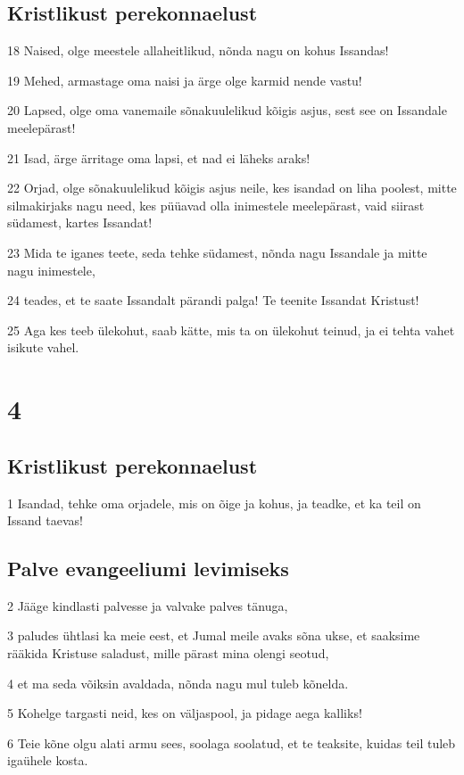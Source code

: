 \section*{Kristlikust perekonnaelust}

\par 18 Naised, olge meestele allaheitlikud, nõnda nagu on kohus Issandas!
\par 19 Mehed, armastage oma naisi ja ärge olge karmid nende vastu!
\par 20 Lapsed, olge oma vanemaile sõnakuulelikud kõigis asjus, sest see on Issandale meelepärast!
\par 21 Isad, ärge ärritage oma lapsi, et nad ei läheks araks!
\par 22 Orjad, olge sõnakuulelikud kõigis asjus neile, kes isandad on liha poolest, mitte silmakirjaks nagu need, kes püüavad olla inimestele meelepärast, vaid siirast südamest, kartes Issandat!
\par 23 Mida te iganes teete, seda tehke südamest, nõnda nagu Issandale ja mitte nagu inimestele,
\par 24 teades, et te saate Issandalt pärandi palga! Te teenite Issandat Kristust!
\par 25 Aga kes teeb ülekohut, saab kätte, mis ta on ülekohut teinud, ja ei tehta vahet isikute vahel.


\chapter{4}

\section*{Kristlikust perekonnaelust}

\par 1 Isandad, tehke oma orjadele, mis on õige ja kohus, ja teadke, et ka teil on Issand taevas!
\section*{Palve evangeeliumi levimiseks}

\par 2 Jääge kindlasti palvesse ja valvake palves tänuga,
\par 3 paludes ühtlasi ka meie eest, et Jumal meile avaks sõna ukse, et saaksime rääkida Kristuse saladust, mille pärast mina olengi seotud,
\par 4 et ma seda võiksin avaldada, nõnda nagu mul tuleb kõnelda.
\par 5 Kohelge targasti neid, kes on väljaspool, ja pidage aega kalliks!
\par 6 Teie kõne olgu alati armu sees, soolaga soolatud, et te teaksite, kuidas teil tuleb igaühele kosta.

